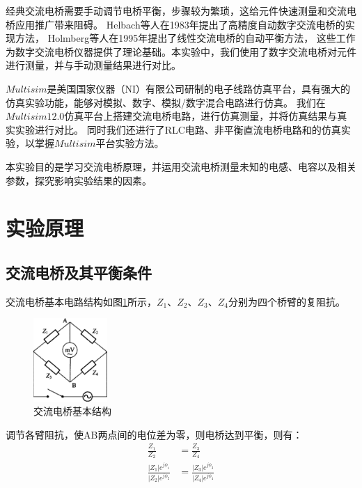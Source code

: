 \documentclass[10pt,a4paper,twocolumn,twoside,UTF8]{ctexart}
\begin{document}
经典交流电桥需要手动调节电桥平衡，步骤较为繁琐，这给元件快速测量和交流电桥应用推广带来阻碍。
Helbach等人在1983年提出了高精度自动数字交流电桥的实现方法\autocite{helbachHighPrecisionAutomaticDigital1983}，
Holmberg等人在1995年提出了线性交流电桥的自动平衡方法\autocite{holmbergAutomaticBalancingLinear1995}，
这些工作为数字交流电桥仪器提供了理论基础。本实验中，我们使用了数字交流电桥对元件进行测量，并与手动测量结果进行对比。

$Multisim$是美国国家仪器（NI）有限公司研制的电子线路仿真平台，具有强大的仿真实验功能，能够对模拟、数字、模拟/数字混合电路进行仿真。
我们在$Multisim 12.0$仿真平台上搭建交流电桥电路，进行仿真测量，并将仿真结果与真实实验进行对比。
同时我们还进行了RLC电路、非平衡直流电桥电路和的仿真实验，以掌握$Multisim$平台实验方法。

本实验目的是学习交流电桥原理，并运用交流电桥测量未知的电感、电容以及相关参数，探究影响实验结果的因素。


\section{实验原理\autocite{shenJiChuWuLiShiYan2015}}

	\subsection{交流电桥及其平衡条件}
	交流电桥基本电路结构如图\ref{fig:illus-1}所示，$Z_1$、$Z_2$、$Z_3$、$Z_4$分别为四个桥臂的复阻抗。
		\begin{figure}[htbp]
			\centering
			\includegraphics[width=0.25\textwidth]{attachments/illus-1.png}
			\caption{交流电桥基本结构}
			\label{fig:illus-1}
		\end{figure}

	调节各臂阻抗，使AB两点间的电位差为零，则电桥达到平衡，则有：
		\begin{align}
			\frac{Z_1}{Z_2} &= \frac{Z_3}{Z_4} \\
			\frac{|Z_1|e^{j\phi_1}}{|Z_2|e^{j\phi_2}} &= \frac{|Z_3|e^{j\phi_3}}{|Z_4|e^{j\phi_4}}
		\end{align}
\end{document}
